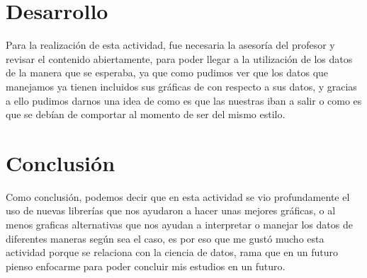 \documentclass[12pt]{article}
\begin{document}
\section{Desarrollo}
Para la realización de esta actividad, fue necesaria la asesoría del profesor y revisar el contenido abiertamente, para poder llegar a la utilización de los datos de la manera que se esperaba, ya que como pudimos ver que los datos que manejamos ya tienen incluidos sus gráficas de con respecto a sus datos, y gracias a ello pudimos darnos una idea de como es que las nuestras iban a salir o como es que se debían de comportar al momento de ser del mismo estilo.

\section{Conclusión}
Como conclusión, podemos decir que en esta actividad se vio profundamente el uso de nuevas librerías que nos ayudaron a hacer unas mejores gráficas, o al menos graficas alternativas que nos ayudan a interpretar o manejar los datos de diferentes maneras según sea el caso, es por eso que me gustó mucho esta actividad porque se relaciona con la ciencia de datos, rama que en un futuro pienso enfocarme para poder concluir mis estudios en un futuro.
\end{document}

